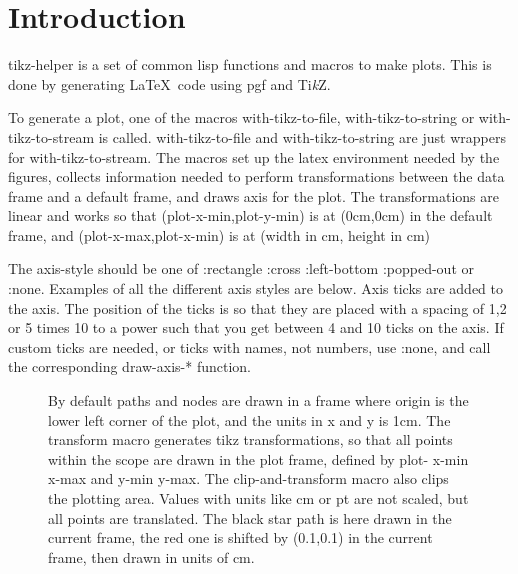 \documentclass{article}
\begin{document}
\section{Introduction}


tikz-helper is a set of common lisp functions and macros to make plots. This is done by 
generating \LaTeX \ code using pgf and {Ti\textit{k}Z}.



To generate a plot, one of the macros with-tikz-to-file, with-tikz-to-string or with-tikz-to-stream is called.
with-tikz-to-file and with-tikz-to-string are just wrappers for with-tikz-to-stream.
The macros set up the latex environment needed by the figures, collects information needed to perform
transformations between the data frame and a default frame, and draws axis for the plot. The transformations are
linear and works so that (plot-x-min,plot-y-min) is at (0cm,0cm) in the default frame, and  (plot-x-max,plot-x-min) is at (width in cm, height in cm)



The axis-style should be one of :rectangle :cross :left-bottom :popped-out or :none.
Examples of all the different axis styles are below. Axis ticks are added to the axis. The position of the ticks is so
that they are placed with a spacing of 1,2 or 5 times 10 to a power such that you get between 4 and 10 ticks on the
axis. If custom ticks are needed, or ticks with names, not numbers, use :none, and call the corresponding draw-axis-*
function.

\begin{figure}[H]
\centering

\captionsetup{singlelinecheck=off}
\caption[asdf]{By default paths and nodes are drawn in a frame where origin is the lower left corner of the plot,
and the units in x and y is 1cm. The transform macro generates tikz transformations, so that all points
within the scope are drawn in the plot frame, defined by plot- x-min x-max and y-min y-max.
 The clip-and-transform macro also clips the plotting area. Values with units like cm or pt are not scaled, 
but all points are translated. The black star path is here drawn in the current frame, the red one 
is shifted by (0.1,0.1) in the current frame, then drawn in units of cm.}
\end{figure}
\end{document}
